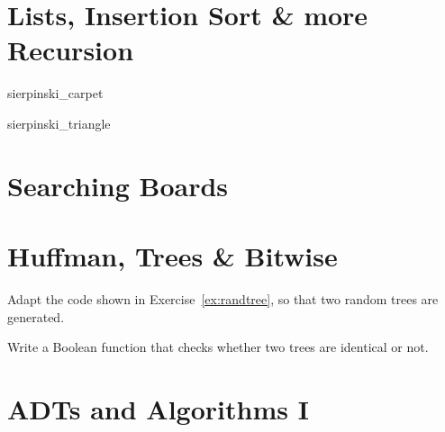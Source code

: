 














\chapter{Lists, Insertion Sort \& more Recursion}





 {sierpinski_carpet}

 {sierpinski_triangle}

\chapter{Searching Boards}








\setcounter{chapter}{8}
\chapter{Huffman, Trees \& Bitwise}



Adapt the code shown in Exercise~\ref{ex:randtree}, so that two random trees are generated.
\begin{exercise}
Write a Boolean function that checks whether two trees are identical or not.
\end{exercise}











\chapter{ADTs and Algorithms I}

